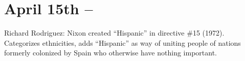 \section{April 15th -- }

Richard Rodriguez: Nixon created ``Hispanic'' in directive \#15 (1972). Categorizes ethnicities, adds ``Hispanic'' as way of uniting people of nations formerly colonized by Spain who otherwise have nothing important.

